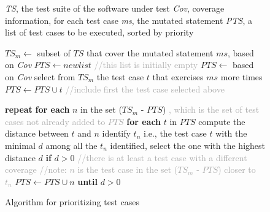 
\newcommand{\INDA}{10}
\newcommand{\INDB}{15}
\newcommand{\INDC}{5}

\begin{figure}[tb]

\begin{algorithmic}[1]

\scriptsize
\Require \emph{TS}, the test suite of the software under test
\Require \emph{Cov}, coverage information, for each test case
\Require \emph{ms}, the mutated statement
\Ensure \emph{PTS}, a list of test cases to be executed, sorted by priority

\State $\mathit{TS}_m \gets$ subset of $\mathit{TS}$ that cover the mutated statement $\mathit{ms}$, based on \emph{Cov} \label{alg:prioritize:select}
\State $\mathit{PTS} \gets \mathit{new} \mathit{list}$ \textcolor{darkgray}{//this list is initially empty}
\State $\mathit{PTS} \gets$ based on \emph{Cov} select from $\mathit{TS_m}$ the test case $t$ that exercises $\mathit{ms}$ more times \label{alg:prioritize:first}
\State $\mathit{PTS} \gets \mathit{PTS} \cup t$ \textcolor{darkgray}{//include first the test case selected above}  \label{alg:prioritize:add}

\State \textbf{repeat} \label{alg:prioritize:repeat}
\State \hspace{\INDC mm} \textbf{for each} $n$ in the set ($\mathit{TS}_m$ - $\mathit{PTS}$) \textcolor{darkgray}{, which is the set of test cases not already added to $\mathit{PTS}$} \label{alg:prioritize:notSel}
\State \hspace{\INDA mm} \textbf{for each} $t$ in $\mathit{PTS}$
\State \hspace{\INDB mm} compute the distance between $t$ and $n$
\State \hspace{\INDA mm} identify $t_n$ i.e., the test case $t$ with the minimal $d$ \label{alg:prioritize:minD}
\State \hspace{\INDC mm} among all the $t_n$ identified, select the one with the highest distance $d$ \label{alg:prioritize:selectStart}
\State \hspace{\INDC mm} \textbf{if} $d > 0$ \textcolor{darkgray}{//there is at least a test case with a different coverage}
\State \hspace{\INDA mm} \textcolor{darkgray}{//note: $n$ is the test case in the set ($\mathit{TS}_m$ - $\mathit{PTS}$) closer to $t_n$}
\State \hspace{\INDA mm} $\mathit{PTS} \gets \mathit{PTS} \cup n$ \label{alg:prioritize:selectEnd}
\State \textbf{until} $d > 0$ \label{alg:prioritize:until}


\end{algorithmic}
\vspace{-3mm}
\caption{Algorithm for prioritizing test cases}
\label{alg:prioritize}
\end{figure}


